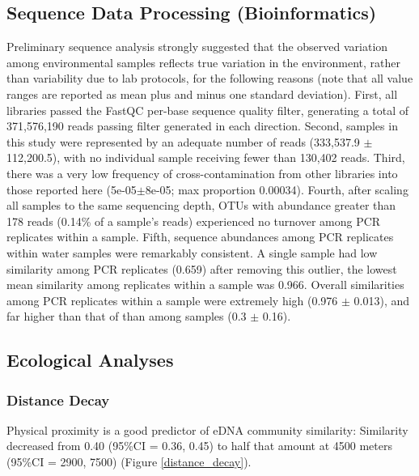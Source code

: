 \documentclass[11pt,letterpaper]{article} %
\begin{document}
\subsection*{Sequence Data Processing (Bioinformatics)}
Preliminary sequence analysis strongly suggested that the observed variation among environmental samples reflects true variation in the environment, rather than variability due to lab protocols, for the following reasons (note that all value ranges are reported as mean plus and minus one standard deviation). First, all libraries passed the FastQC per-base sequence quality filter, generating a total of 371,576,190 reads passing filter generated in each direction. Second, samples in this study were represented by an adequate number of reads (333,537.9 $\pm$ 112,200.5), with no individual sample receiving fewer than 130,402 reads. Third, there was a very low frequency of cross-contamination from other libraries into those reported here (5e-05$\pm$8e-05; max proportion 0.00034). Fourth, after scaling all samples to the same sequencing depth, OTUs with abundance greater than 178 reads (0.14\% of a sample's reads) experienced no turnover among PCR replicates within a sample. Fifth, sequence abundances among PCR replicates within water samples were remarkably consistent. A single sample had low similarity among PCR replicates (0.659) after removing this outlier, the lowest mean similarity among replicates within a sample was 0.966. Overall similarities among PCR replicates within a sample were extremely high (0.976 $\pm$ 0.013), and far higher than that of than among samples (0.3 $\pm$ 0.16).


\subsection*{Ecological Analyses}
\subsubsection*{Distance Decay}
Physical proximity is a good predictor of eDNA community similarity: Similarity decreased from 0.40 (95\%CI = 0.36, 0.45) to half that amount at 4500 meters (95\%CI = 2900, 7500) (Figure \ref{distance_decay}).
\end{document}
